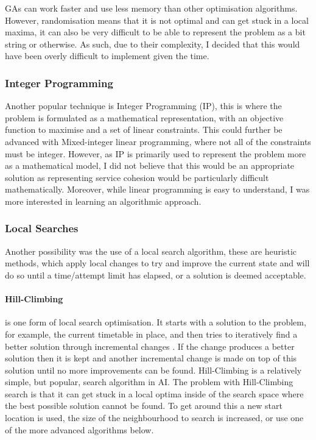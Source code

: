 \documentclass{article}
\begin{document}
\par
GAs can work faster and use less memory than other optimisation algorithms. However, randomisation means that it is not optimal and can get stuck in a local maxima, it can also be very difficult to be able to represent the problem as a bit string or otherwise. As such, due to their complexity, I decided that this would have been overly difficult to implement given the time.  

\subsubsection{Integer Programming}
Another popular technique is Integer Programming (IP), this is where the problem is formulated as a mathematical representation, with an objective function to maximise and a set of linear constraints. This could further be advanced with Mixed-integer linear programming, where not all of the constraints must be integer. However, as IP is primarily used to represent the problem more as a mathematical model, I did not believe that this would be an appropriate solution as representing service cohesion would be particularly difficult mathematically. Moreover, while linear programming is easy to understand, I was more interested in learning an algorithmic approach.

\subsubsection{Local Searches}
Another possibility was the use of a local search algorithm, these are heuristic methods, which apply local changes to try and improve the current state and will do so until a time/attempt limit has elapsed, or a solution is deemed acceptable.

\paragraph{Hill-Climbing} is one form of local search optimisation. It starts with a solution to the problem, for example, the current timetable in place, and then tries to iteratively find a better solution through incremental changes \cite{RN36}. If the change produces a better solution then it is kept and another incremental change is made on top of this solution until no more improvements can be found. Hill-Climbing is a relatively simple, but popular, search algorithm in AI. The problem with Hill-Climbing search is that it can get stuck in a local optima inside of the search space where the best possible solution cannot be found. To get around this a new start location is used, the size of the neighbourhood to search is increased, or use one of the more advanced algorithms below.
\end{document}
